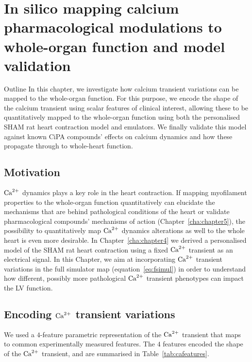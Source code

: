 \chapter{In silico mapping calcium pharmacological modulations to whole-organ function and model validation}\label{cha:chapter6}
%
%
%
\begin{remark}{Outline}
    In this chapter, we investigate how calcium transient variations can be mapped to the whole-organ function. For this purpose, we encode the shape of the calcium transient using scalar features of clinical interest, allowing these to be quantitatively mapped to the whole-organ function using both the personalised SHAM rat heart contraction model and emulators. We finally validate this model against known CiPA compounds' effects on calcium dynamics and how these propagate through to whole-heart function.
\end{remark}


%
%
%
\section{Motivation}\label{sec:ch6motivation}
$\textrm{Ca}^{2+}$ dynamics plays a key role in the heart contraction. If mapping myofilament properties to the whole-organ function quantitatively can elucidate the mechanisms that are behind pathological conditions of the heart or validate pharmacological compounds' mechanisms of action (Chapter~\ref{cha:chapter5}), the possibility to quantitatively map $\textrm{Ca}^{2+}$ dynamics alterations as well to the whole heart is even more desirable. In Chapter~\ref{cha:chapter4} we derived a personalised model of the SHAM rat heart contraction using a fixed $\textrm{Ca}^{2+}$ transient as an electrical signal. In this Chapter, we aim at incorporating $\textrm{Ca}^{2+}$ transient variations in the full simulator map (equation~\ref{eq:fsimul}) in order to understand how different, possibly more pathological $\textrm{Ca}^{2+}$ transient phenotypes can impact the LV function.



%
%
%
\section{Encoding $\textrm{Ca}^{2+}$ transient variations}\label{sec:ch6encoding_ca_transient_variations}
We used a $4$-feature parametric representation of the $\textrm{Ca}^{2+}$ transient that maps to common experimentally measured features. The $4$ features encoded the shape of the $\textrm{Ca}^{2+}$ transient, and are summarised in Table~\ref{tab:cafeatures}.

